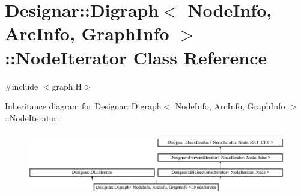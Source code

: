 \hypertarget{class_designar_1_1_digraph_1_1_node_iterator}{}\section{Designar\+:\+:Digraph$<$ Node\+Info, Arc\+Info, Graph\+Info $>$\+:\+:Node\+Iterator Class Reference}
\label{class_designar_1_1_digraph_1_1_node_iterator}


{\ttfamily \#include $<$graph.\+H$>$}

Inheritance diagram for Designar\+:\+:Digraph$<$ Node\+Info, Arc\+Info, Graph\+Info $>$\+:\+:Node\+Iterator\+:\begin{figure}[H]
\begin{center}
\leavevmode
\includegraphics[height=2.879177cm]{class_designar_1_1_digraph_1_1_node_iterator}
\end{center}
\end{figure}

